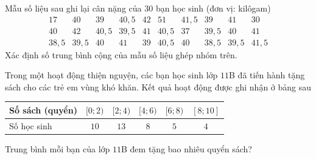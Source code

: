 \begin{ex}%
	Mẫu số  liệu sau ghi lại cân nặng của $30$ bạn học sinh (đơn vị: kilôgam)
	\[ 
	\begin{array}{cccccccccc}
		17 & 40 & 39 & 40{,}5 & 42 & 51 & 41{,}5 & 39 & 41 &  30\\
		40 & 42 & 40{,}5 & 39{,}5 & 41 & 40{,}5 & 37  & 39{,}5 & 40 & 41\\
		38{,}5 & 39{,}5 & 40 & 41 & 39 & 40{,}5 & 40 & 38{,}5 & 39{,}5 &  41{,}5
	\end{array}
	 \]
	Xác định số trung bình cộng của mẫu số liệu ghép nhóm trên. 
\end{ex}

\begin{ex}%
	Trong một hoạt động thiện nguyện,  các bạn học sinh lớp $11$B đã tiến hành tặng sách cho các trẻ em vùng khó khăn. Kết quả hoạt động được ghi nhận ở bảng sau
	\begin{center}
		\begin{tabular}{|l|c|c|c|c|c|}
			\hline Số sách (quyển) & { $[0; 2)$ } & { $[2; 4)$ } & { $[4; 6)$ } & { $[6; 8)$ } & { $[8; 10]$  } \\
			\hline Số học sinh & $10$ & $13$ &  $8$ & $5$ & $4$ \\
			\hline 
		\end{tabular}
	\end{center}
	Trung bình mỗi bạn của lớp $11$B đem tặng bao  nhiêu quyển sách?
\end{ex}

